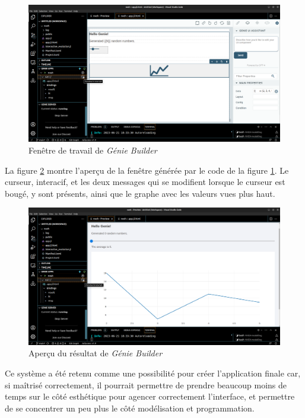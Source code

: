 \documentclass[a4paper, french, 12pt, titlepage]{article}
\begin{document}
\begin{figure}[H]
  \includegraphics[width=\linewidth]{geniebuilder_travail.png}
  \caption{Fenêtre de travail de \emph{Génie Builder}}
  \label{fig:fig6}
\end{figure}

La figure \ref{fig:fig7} montre l'aperçu de la fenêtre générée par le code de la figure \ref{fig:fig6}. Le curseur, interacif, et les deux messages qui se modifient lorsque le curseur est bougé, y sont présents, ainsi que le graphe avec les valeurs vues plus haut. \\

\begin{figure}[H]
  \includegraphics[width=\linewidth]{geniebuilder_result.png}
  \caption{Aperçu du résultat de \emph{Génie Builder}}
  \label{fig:fig7}
\end{figure}

Ce système a été retenu comme une possibilité pour créer l'application finale car, si maîtrisé correctement, il pourrait permettre de prendre beaucoup moins de temps sur le côté esthétique pour agencer correctement l'interface, et permettre de se concentrer un peu plus le côté modélisation et programmation.  \\
\end{document}
